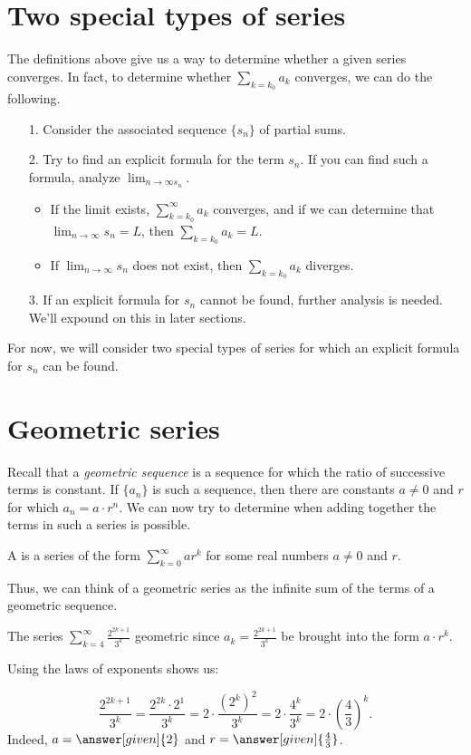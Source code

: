 \documentclass{ximera}
\begin{document}
\section{Two special types of series}
The definitions above give us a way to determine whether a given series converges.  In fact, to determine whether $\sum_{k=k_0} a_k$ converges, we can do the following.

\begin{itemize}
\item[1.] Consider the associated sequence $\{s_n\}$ of partial sums.
\item[2.] Try to find an explicit formula for the term $s_n$.  If you can find such a formula, analyze $\lim_{n \to \infty s_n}$.  
\begin{itemize}
\item If the limit exists, $\sum_{k=k_0}^{\infty} a_k$ converges, and if we can determine that $\lim_{n \to \infty} s_n =L$, then $\sum_{k=k_0} a_k=L$.  \item If  $\lim_{n \to \infty} s_n$ does not exist, then $\sum_{k=k_0} a_k$ diverges.
\end{itemize}
\item[3.] If an explicit formula for $s_n$ cannot be found, further analysis is needed.  We'll expound on this in later sections.
\end{itemize}

For now, we will consider two special types of series for which an explicit formula for $s_n$ can be found.

\section{Geometric series}
Recall that a \emph{geometric sequence} is a sequence for which the ratio of successive terms is constant.  If $\{a_n\}$ is such a sequence, then there are constants $a \ne 0$ and $r$ for which $a_n = a\cdot r^n$.  We can now try to determine when adding together the terms in such a series is possible.

\begin{definition}
  A  is a series of the form $\sum_{k=0}^\infty ar^k$
  for some real numbers $a \ne 0$ and $r$.
\end{definition}

Thus, we can think of a geometric series as the infinite sum of the terms of a geometric sequence.  

\begin{example}
The series $\sum_{k=4}^\infty \frac{2^{2k+1}}{3^k}$  geometric since $a_k =\frac{2^{2k+1}}{3^k}$  be brought into the form $a \cdot r^k$.  

Using the laws of exponents shows us:

\[
\frac{2^{2k+1}}{3^k} = \frac{2^{2k} \cdot 2^1}{3^k}= 2 \cdot \frac{\left(2^{k}\right)^2}{3^k} = 2 \cdot \frac{4^k}{3^k} = 2 \cdot \left(\frac{4}{3}\right)^k.
\]
Indeed, $a= \answer[given]{2}$ and $r = \answer[given]{\frac{4}{3}}$.
\end{example}
\end{document}
